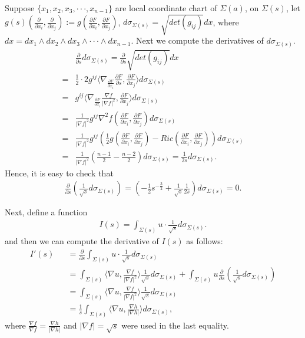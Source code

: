 \documentclass[12pt]{amsart}
\newcommand{\ban}{\begin{eqnarray*}}
\newcommand{\ean}{\end{eqnarray*}}
\begin{document}
	\smallskip
	Suppose $\{x_1, x_2, x_3,\cdot\cdot\cdot, x_{n-1}\}$ are local coordinate chart of $\Sigma(a)$, on $\Sigma(s)$, let  $g(s)(\frac{\partial }{\partial x_i}, \frac{\partial}{\partial x_j}):=g(\frac{\partial F}{\partial x_i}, \frac{\partial F}{\partial x_j})$, $d\sigma_{\Sigma(s)}=\sqrt{det(g_{ij})}dx$, where $dx=dx_1\wedge dx_2\wedge dx_3\wedge\cdot\cdot\cdot\wedge dx_{n-1}$.
	Next we compute the derivatives of $d\sigma_{\Sigma(s)}$.
	\begin{align*}
		&\frac{\partial}{\partial s}d\sigma_{\Sigma(s)}=\frac{\partial}{\partial s}\sqrt{det(g_{ij})}dx\\
		=&\frac{1}{2}\cdot 2 g^{ij}\langle \nabla_{\frac{\partial F}{\partial x_i}}\frac{\partial F}{\partial s}, \frac{\partial F}{\partial x_j}\rangle d\sigma_{\Sigma(s)}\\
		=& g^{ij}\langle \nabla_{\frac{\partial F}{\partial x_i}}\frac{\nabla f}{|\nabla f|^2}, \frac{\partial F}{\partial x_j}\rangle d\sigma_{\Sigma(s)}\\
		=&\frac{1}{|\nabla f|^2}g^{ij}\nabla^2 f(\frac{\partial F}{\partial x_i}, \frac{\partial F}{\partial x_j})d\sigma_{\Sigma(s)}\\
		=&\frac{1}{|\nabla f|^2} g^{ij}\left(\frac{1}{2}g(\frac{\partial F}{\partial x_i}, \frac{\partial F}{\partial x_j})-Ric(\frac{\partial F}{\partial x_i}, \frac{\partial F}{\partial x_j})\right)d\sigma_{\Sigma(s)}\\
		=&\frac{1}{|\nabla f|^2} (\frac{n-1}{2}-\frac{n-2}{2})d\sigma_{\Sigma(s)}=\frac{1}{2s}d\sigma_{\Sigma(s)}.
	\end{align*}
	Hence, it is easy to check that
	\ban
	\frac{\partial}{\partial s}\left(\frac{1}{\sqrt{s}}d\sigma_{\Sigma(s)}\right)=\left(-\frac{1}{2}s^{-\frac{3}{2}}+\frac{1}{\sqrt{s}}\frac{1}{2s}\right) d\sigma_{\Sigma(s)}=0.
	\ean
	
	
	Next, define a function
	\ban
	I(s)=\int_{\Sigma(s)} u\cdot \frac{1}{\sqrt{s}} d\sigma_{\Sigma(s)}.
	\ean
	and then we can compute the derivative of $I(s)$ as follows:
	\ban
	I'(s)&&=\frac{\partial}{\partial s}\int_{\Sigma(s)} u\cdot \frac{1}{\sqrt{s}} d\sigma_{\Sigma(s)}\\
	&&=\int_{\Sigma(s)} \langle \nabla u, \frac{\nabla f}{|\nabla f|^2}\rangle \frac{1}{\sqrt{s}}d\sigma_{\Sigma(s)}+\int_{\Sigma(s)} u\frac{\partial}{\partial s}\left(\frac{1}{\sqrt{s}}d\sigma_{\Sigma(s)}\right)\\
	&&=\int_{\Sigma(s)} \langle \nabla u, \frac{\nabla f}{|\nabla f|^2}\rangle \frac{1}{\sqrt{s}}d\sigma_{\Sigma(s)}\\
	&&=\frac{1}{s}\int_{\Sigma(s)} \langle \nabla u, \frac{\nabla h}{|\nabla h|}\rangle d\sigma_{\Sigma(s)},
	\ean
	where $\frac{\nabla f}{\nabla f}=\frac{\nabla h}{|\nabla h|}$ and $|\nabla f|=\sqrt{s}$ were used in the last equality.
	
\end{document}
